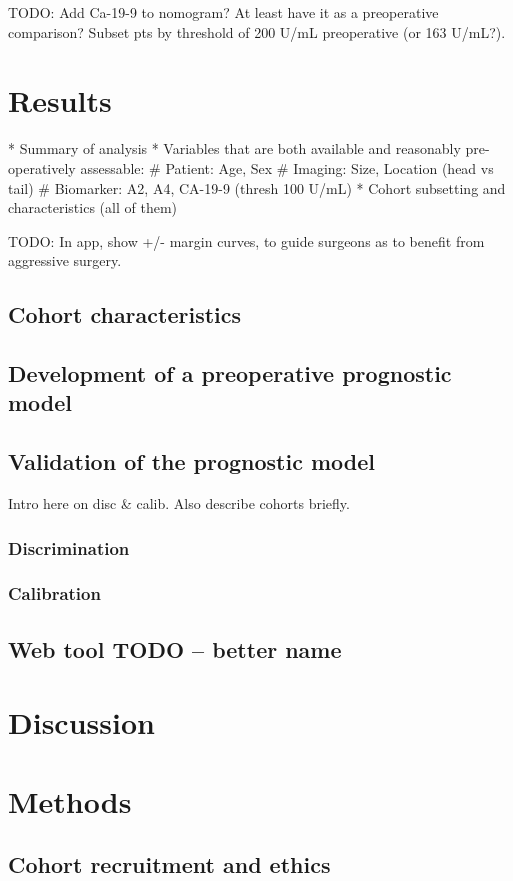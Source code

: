 \documentclass[dissertation.tex]{subfiles}
\begin{document}
TODO: Add Ca-19-9 to nomogram?  At least have it as a preoperative comparison?  Subset pts by threshold of 200 U/mL preoperative (or 163 U/mL?).

\section{Results}

* Summary of analysis
* Variables that are both available and reasonably pre-operatively assessable:
  # Patient:   Age, Sex
  # Imaging:   Size, Location (head vs tail)
  # Biomarker: A2, A4, CA-19-9 (thresh 100 U/mL)
* Cohort subsetting and characteristics (all of them)


TODO: In app, show +/- margin curves, to guide surgeons as to benefit from aggressive surgery.


\subsection{Cohort characteristics}
\label{subsec:nomo-results-cohort}

\subsection{Development of a preoperative prognostic model}

\subsection{Validation of the prognostic model}
Intro here on disc \& calib.  Also describe cohorts briefly.
\subsubsection{Discrimination}
\subsubsection{Calibration}

\subsection{Web tool TODO -- better name}

\section{Discussion}

\section{Methods}
\subsection{Cohort recruitment and ethics}
\label{subsec:nomo-methods-cohort}
\end{document}
